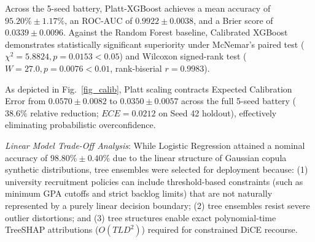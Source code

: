 \documentclass[conference]{IEEEtran}
\begin{document}
\begin{table}[htbp]
\caption{Model Performance Comparison on \texttt{DS-SYNTH-01} ($N=2,500$)}
\label{tab_models}
\centering
{}
\end{table}

Across the 5-seed battery, Platt-XGBoost achieves a mean accuracy of $95.20\% \pm 1.17\%$, an ROC-AUC of $0.9922 \pm 0.0038$, and a Brier score of $0.0339 \pm 0.0096$. Against the Random Forest baseline, Calibrated XGBoost demonstrates statistically significant superiority under McNemar's paired test ($\chi^2 = 5.8824, p = 0.0153 < 0.05$) and Wilcoxon signed-rank test ($W = 27.0, p = 0.0076 < 0.01$, rank-biserial $r = 0.9983$).

As depicted in Fig.~\ref{fig_calib}, Platt scaling contracts Expected Calibration Error from $0.0570 \pm 0.0082$ to $0.0350 \pm 0.0057$ across the full 5-seed battery ($38.6\%$ relative reduction; $ECE = 0.0212$ on Seed 42 holdout), effectively eliminating probabilistic overconfidence.

\textit{Linear Model Trade-Off Analysis}: While Logistic Regression attained a nominal accuracy of $98.80\% \pm 0.40\%$ due to the linear structure of Gaussian copula synthetic distributions, tree ensembles were selected for deployment because: (1) university recruitment policies can include threshold-based constraints (such as minimum GPA cutoffs and strict backlog limits) that are not naturally represented by a purely linear decision boundary; (2) tree ensembles resist severe outlier distortions; and (3) tree structures enable exact polynomial-time TreeSHAP attributions ($O(TLD^2)$) required for constrained DiCE recourse.
\end{document}
